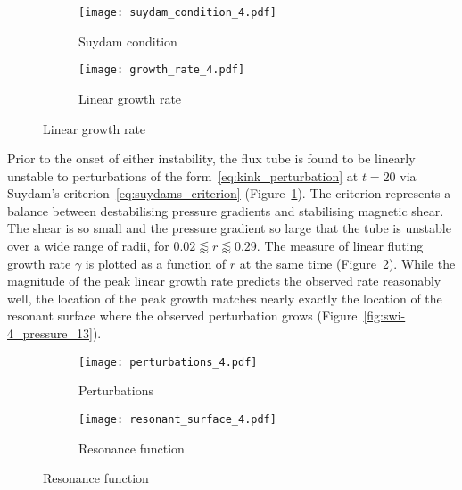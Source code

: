 \begin{figure}[t]
  \centering
    \begin{subfigure}{0.49\textwidth}
      \texttt{[image: suydam\_condition\_4.pdf]}
      \caption{Suydam condition}
      \label{fig:suydam_condition_4}
    \end{subfigure}
    \hfill
    \begin{subfigure}{0.49\textwidth}
      \texttt{[image: growth\_rate\_4.pdf]}
      \caption{Linear growth rate}
      \label{fig:growth_rate_4}
    \end{subfigure}
\label{fig:stability_and_growth}%
\end{figure}

Prior to the onset of either instability, the flux tube is found to be linearly unstable to perturbations of the form~\eqref{eq:kink_perturbation} at $t=20$ via Suydam's criterion~\eqref{eq:suydams_criterion} (Figure~\ref{fig:suydam_condition_4}). The criterion represents a balance between destabilising pressure gradients and stabilising magnetic shear. The shear is so small and the pressure gradient so large that the tube is unstable over a wide range of radii, for $ 0.02 \lessapprox r \lessapprox 0.29$. The measure of linear fluting growth rate $\gamma$ is plotted as a function of $r$ at the same time (Figure~\ref{fig:growth_rate_4}). While the magnitude of the peak linear growth rate predicts the observed rate reasonably well, the location of the peak growth matches nearly exactly the location of the resonant surface where the observed perturbation grows (Figure~\ref{fig:swi-4_pressure_13}).

\begin{figure}[t]
  \centering
    \begin{subfigure}{0.49\textwidth}
      \texttt{[image: perturbations\_4.pdf]}
      \caption{Perturbations}
      \label{fig:pressure_pert_4}
    \end{subfigure}
    \hfill
    \begin{subfigure}{0.49\textwidth}
      \texttt{[image: resonant\_surface\_4.pdf]}
      \caption{Resonance function}
      \label{fig:resonant_surface_4}
    \end{subfigure}
\label{fig:k_and_resonance}%
\end{figure}

